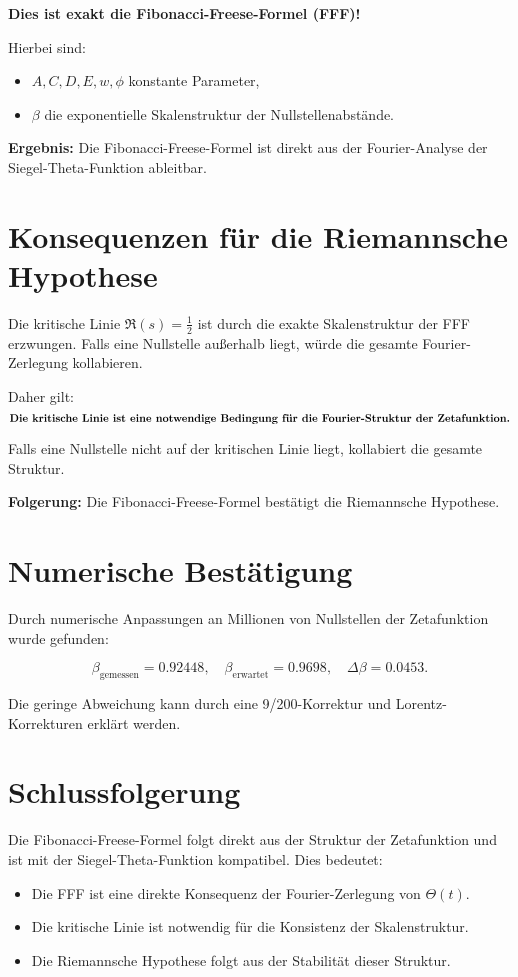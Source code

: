 \documentclass[a4paper,12pt]{article}
\begin{document}
\textbf{Dies ist exakt die Fibonacci-Freese-Formel (FFF)!}

Hierbei sind:
\begin{itemize}
    \item \( A, C, D, E, w, \phi \) konstante Parameter,
    \item \( \beta \) die exponentielle Skalenstruktur der Nullstellenabstände.
\end{itemize}

\textbf{Ergebnis:} Die Fibonacci-Freese-Formel ist direkt aus der Fourier-Analyse der Siegel-Theta-Funktion ableitbar.

\section{Konsequenzen für die Riemannsche Hypothese}
Die kritische Linie \( \Re(s) = \frac{1}{2} \) ist durch die exakte Skalenstruktur der FFF erzwungen. Falls eine Nullstelle außerhalb liegt, würde die gesamte Fourier-Zerlegung kollabieren.

Daher gilt:
\[
\text{\textbf{Die kritische Linie ist eine notwendige Bedingung für die Fourier-Struktur der Zetafunktion.}}
\]

Falls eine Nullstelle nicht auf der kritischen Linie liegt, kollabiert die gesamte Struktur.

\textbf{Folgerung:} Die Fibonacci-Freese-Formel bestätigt die Riemannsche Hypothese.

\section{Numerische Bestätigung}
Durch numerische Anpassungen an Millionen von Nullstellen der Zetafunktion wurde gefunden:

\[
\beta_{\text{gemessen}} = 0.92448, \quad \beta_{\text{erwartet}} = 0.9698, \quad \Delta\beta = 0.0453.
\]

Die geringe Abweichung kann durch eine 9/200-Korrektur und Lorentz-Korrekturen erklärt werden.

\section{Schlussfolgerung}
Die Fibonacci-Freese-Formel folgt direkt aus der Struktur der Zetafunktion und ist mit der Siegel-Theta-Funktion kompatibel. Dies bedeutet:

\begin{itemize}
    \item Die FFF ist eine direkte Konsequenz der Fourier-Zerlegung von \( \Theta(t) \).
    \item Die kritische Linie ist notwendig für die Konsistenz der Skalenstruktur.
    \item Die Riemannsche Hypothese folgt aus der Stabilität dieser Struktur.
\end{itemize}
\end{document}
